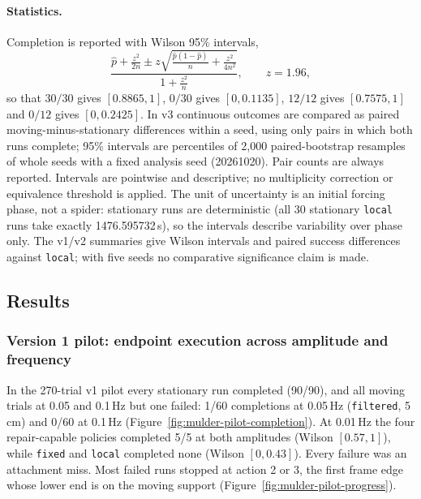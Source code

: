 \paragraph{Statistics.} Completion is reported with Wilson 95\% intervals,
\begin{equation}
  \frac{\hat p + \frac{z^2}{2n} \pm z\sqrt{\frac{\hat p(1-\hat p)}{n}+\frac{z^2}{4n^2}}}{1+\frac{z^2}{n}},
  \qquad z = 1.96,
  \label{eq:mulder-wilson}
\end{equation}
so that $30/30$ gives $[0.8865, 1]$, $0/30$ gives $[0, 0.1135]$, $12/12$ gives $[0.7575, 1]$ and $0/12$
gives $[0, 0.2425]$. In v3 continuous outcomes are compared as paired moving-minus-stationary
differences within a seed, using only pairs in which both runs complete; 95\% intervals are
percentiles of 2{,}000 paired-bootstrap resamples of whole seeds with a fixed analysis seed (20261020).
Pair counts are always reported. Intervals are pointwise and descriptive; no multiplicity correction
or equivalence threshold is applied. The unit of uncertainty is an initial forcing phase, not a spider:
stationary runs are deterministic (all 30 stationary \texttt{local} runs take exactly 1476.595732\,s),
so the intervals describe variability over phase only. The v1/v2 summaries give Wilson intervals and
paired success differences against \texttt{local}; with five seeds no comparative significance claim
is made.

\subsection{Results}
\label{sec:mulder-results}

\subsubsection{Version 1 pilot: endpoint execution across amplitude and frequency}
\label{sec:mulder-pilot}

In the 270-trial v1 pilot every stationary run completed (90/90), and all moving trials at 0.05 and
0.1\,Hz but one failed: 1/60 completions at 0.05\,Hz (\texttt{filtered}, 5\,cm) and 0/60 at 0.1\,Hz
(Figure~\ref{fig:mulder-pilot-completion}). At 0.01\,Hz the four repair-capable policies completed 5/5
at both amplitudes (Wilson $[0.57,1]$), while \texttt{fixed} and \texttt{local} completed none
(Wilson $[0,0.43]$). Every failure was an attachment miss. Most failed runs stopped at action 2 or 3,
the first frame edge whose lower end is on the moving support (Figure~\ref{fig:mulder-pilot-progress}).

